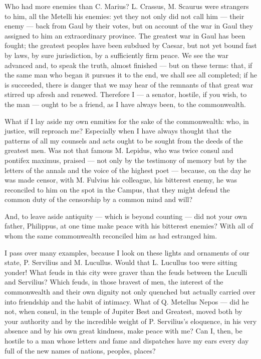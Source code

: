 Who had more enemies than C. Marius? L. Crassus, M. Scaurus were strangers to him, all the Metelli his enemies: yet they not only did not call him --- their enemy --- back from Gaul by their votes, but on account of the war in Gaul they assigned to him an extraordinary province. The greatest war in Gaul has been fought; the greatest peoples have been subdued by Caesar, but not yet bound fast by laws, by sure jurisdiction, by a sufficiently firm peace. We see the war advanced and, to speak the truth, almost finished --- but on these terms: that, if the same man who began it pursues it to the end, we shall see all completed; if he is succeeded, there is danger that we may hear of the remnants of that great war stirred up afresh and renewed. Therefore I --- a senator, hostile, if you wish, to the man --- ought to be a friend, as I have always been, to the commonwealth.

 What if I lay aside my own enmities for the sake of the commonwealth: who, in justice, will reproach me? Especially when I have always thought that the patterns of all my counsels and acts ought to be sought from the deeds of the greatest men. Was not that famous M. Lepidus, who was twice consul and pontifex maximus, praised --- not only by the testimony of memory but by the letters of the annals and the voice of the highest poet --- because, on the day he was made censor, with M. Fulvius his colleague, his bitterest enemy, he was reconciled to him on the spot in the Campus, that they might defend the common duty of the censorship by a common mind and will?

 And, to leave aside antiquity --- which is beyond counting --- did not your own father, Philippus, at one time make peace with his bitterest enemies? With all of whom the same commonwealth reconciled him as had estranged him.

 I pass over many examples, because I look on these lights and ornaments of our state, P. Servilius and M. Lucullus. Would that L. Lucullus too were sitting yonder! What feuds in this city were graver than the feuds between the Luculli and Servilius? Which feuds, in those bravest of men, the interest of the commonwealth and their own dignity not only quenched but actually carried over into friendship and the habit of intimacy. What of Q. Metellus Nepos --- did he not, when consul, in the temple of Jupiter Best and Greatest, moved both by your authority and by the incredible weight of P. Servilius's eloquence, in his very absence and by his own great kindness, make peace with me? Can I, then, be hostile to a man whose letters and fame and dispatches have my ears every day full of the new names of nations, peoples, places?

